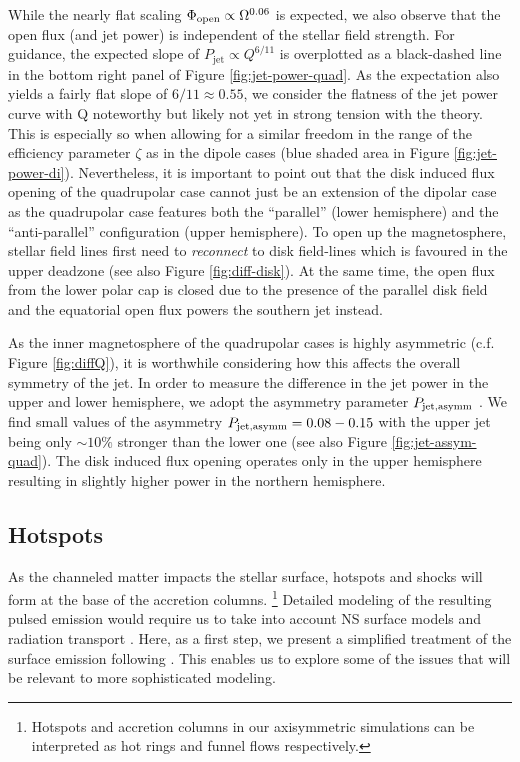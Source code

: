 \documentclass[fleqn,usenatbib]{mnras}
\begin{document}
While the nearly flat scaling $\Phi_{\rm open} \propto \Omega^{0.06}$ is expected, we also observe that the open flux (and jet power) is independent of the stellar field strength.  For guidance, the expected slope of $P_{\text{jet}} \propto Q^{6/11}$ is overplotted as a black-dashed line in the bottom right panel of Figure \ref{fig:jet-power-quad}.  
As the expectation also yields a fairly flat slope of $6/11\approx 0.55$, we consider the flatness of the jet power curve with Q noteworthy but likely not yet in strong tension with the theory.  This is especially so when allowing for a similar freedom in the range of the efficiency parameter $\zeta$ as in the dipole cases (blue shaded area in Figure \ref{fig:jet-power-di}). 
Nevertheless, it is important to point out that the disk induced flux opening of the quadrupolar case cannot just be an extension of the dipolar case as the quadrupolar case features both the ``parallel'' (lower hemisphere) and the ``anti-parallel'' configuration (upper hemisphere).  To open up the magnetosphere, stellar field lines first need to \textit{reconnect} to disk field-lines which is favoured in the upper deadzone (see also Figure \ref{fig:diff-disk}). At the same time, the open flux from the lower polar cap is closed due to the presence of the parallel disk field and the equatorial open flux powers the southern jet instead.  

As the inner magnetosphere of the quadrupolar cases is highly asymmetric (c.f. Figure \ref{fig:diffQ}), it is worthwhile considering how this affects the overall symmetry of the jet.  In order to measure the difference in the jet power in the upper and lower hemisphere, we adopt the asymmetry parameter $P_{\rm jet, asymm}$ \citep[][and Appendix \ref{sec:asymm}]{Nathanail2020}. We find small values of the asymmetry $P_{\rm jet, asymm} = 0.08-0.15$ with the upper jet being only $\sim10\%$ stronger than the lower one (see also  Figure \ref{fig:jet-assym-quad}). The disk induced flux opening operates only in the upper hemisphere resulting in slightly higher power in the northern hemisphere.
\subsection{Hotspots}\label{sec:hotspots}

As the channeled matter impacts the stellar surface, hotspots and shocks will form at the base of the accretion columns. 
\footnote{Hotspots and accretion columns in our axisymmetric simulations can be interpreted as hot rings and funnel flows respectively.}
Detailed modeling of the resulting pulsed emission would require us to take into account NS surface models and radiation transport \citep[see for example][]{Poutanen03,Salmi18}. Here, as a first step, we present a simplified treatment of the surface emission following \cite{Romanova2004}. This enables us to explore some of the issues that will be relevant to more sophisticated modeling.
\end{document}
